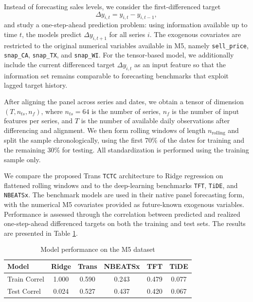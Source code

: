 \documentclass{article}
\begin{document}
Instead of forecasting sales levels, we consider the first-differenced target
\[
\Delta y_{i,t} = y_{i,t} - y_{i,t-1},
\]
and study a one-step-ahead prediction problem: using information available up to time $t$, the models predict $\Delta y_{i,t+1}$ for all series $i$. The exogenous covariates are restricted to the original numerical variables available in M5, namely
\texttt{sell\_price}, \texttt{snap\_CA}, \texttt{snap\_TX}, and \texttt{snap\_WI}. For the tensor-based model, we additionally include the current differenced target $\Delta y_{i,t}$ as an input feature so that the information set remains comparable to forecasting benchmarks that exploit lagged target history.

After aligning the panel across series and dates, we obtain a tensor of dimension $(T, n_{ts}, n_f)$, where $n_{ts}=64$ is the number of series, $n_f$ is the number of input features per series, and $T$ is the number of available daily observations after differencing and alignment. We then form rolling windows of length $n_{\mathrm{rolling}}$ and split the sample chronologically, using the first 70\% of the dates for training and the remaining 30\% for testing. All standardization is performed using the training sample only.

We compare the proposed Trans \texttt{TCTC} architecture to Ridge regression on flattened rolling windows and to the deep-learning benchmarks \texttt{TFT}, \texttt{TiDE}, and \texttt{NBEATSx}. The benchmark models are used in their native panel forecasting form, with the numerical M5 covariates provided as future-known exogenous variables. Performance is assessed through the correlation between predicted and realized one-step-ahead differenced targets on both the training and test sets. The results are presented in Table \ref{tab:model_performance}.

\begin{table}[h]
    \centering
    \begin{tabular}{lccccc}
\toprule
Model & Ridge & Trans & NBEATSx & TFT & TiDE \\
\midrule
Train Correl & {\cellcolor[HTML]{B40426}} \color[HTML]{F1F1F1} 1.000 & {\cellcolor[HTML]{EAD4C8}} \color[HTML]{000000} 0.590 & {\cellcolor[HTML]{7597F6}} \color[HTML]{F1F1F1} 0.243 & {\cellcolor[HTML]{CBD8EE}} \color[HTML]{000000} 0.479 & {\cellcolor[HTML]{3B4CC0}} \color[HTML]{F1F1F1} 0.077 \\
Test Correl & {\cellcolor[HTML]{3B4CC0}} \color[HTML]{F1F1F1} 0.024 & {\cellcolor[HTML]{B40426}} \color[HTML]{F1F1F1} 0.527 & {\cellcolor[HTML]{E97A5F}} \color[HTML]{F1F1F1} 0.437 & {\cellcolor[HTML]{F08A6C}} \color[HTML]{F1F1F1} 0.420 & {\cellcolor[HTML]{5470DE}} \color[HTML]{F1F1F1} 0.067 \\
\bottomrule
\end{tabular}
\vskip 0.05in
\caption{Model performance on the M5 dataset}
\label{tab:model_performance}
    \end{table}
\end{document}
